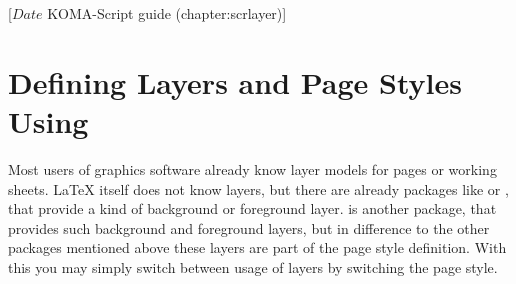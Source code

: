 %
%
%
%
%
%
%
%
% 
%
%
%
%

                 [$Date$
                  KOMA-Script guide (chapter:scrlayer)]



\chapter[{Defining Layers and Page Styles Using \Package{scrlayer}}]%
{Defining Layers and Page Styles Using %
}
\BeginIndexGroup
{}%
%
Most users of graphics software already know layer models for pages or working
sheets. \LaTeX{} itself does not know layers, but there are already packages
like  or , that provide a kind of
background or foreground layer.  is another package,
that provides such background and foreground layers, but in difference
to the other packages mentioned above these layers are part of the
page style definition. With this you may simply switch between usage
of layers by switching the page style.

